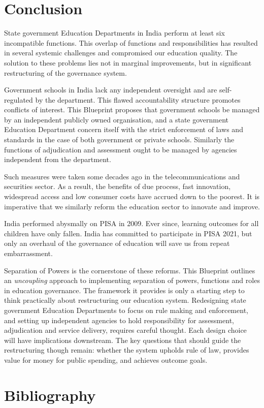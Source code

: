 \documentclass[a4paper, 12pt, twoside]{article}
\begin{document}
\newpage
\section*{Conclusion}

State government Education Departments in India perform at least six incompatible functions. This overlap of functions and responsibilities has resulted in several systemic challenges and compromised our education quality. The solution to these problems lies not in marginal improvements, but in significant restructuring of the governance system. 

Government schools in India lack any independent oversight and are self-regulated by the department. This flawed accountability structure promotes conflicts of interest. This Blueprint proposes that government schools be managed by an independent publicly owned organisation, and a state government Education Department concern itself with the strict enforcement of laws and standards in the case of both government or private schools. Similarly the functions of adjudication and assessment ought to be managed by agencies independent from the department.

Such measures were taken some decades ago in the telecommunications and securities sector. As a result, the benefits of due process, fast innovation, widespread access and low consumer costs have accrued down to the poorest. It is imperative that we similarly reform the education sector to innovate and improve. 

India performed abysmally on PISA in 2009. Ever since, learning outcomes for all children have only fallen. India has committed to participate in PISA 2021, but only an overhaul of the governance of education will save us from repeat embarrassment. 

Separation of Powers is the cornerstone of these reforms. This Blueprint outlines an \textit{uncoupling} approach to implementing separation of powers, functions and roles in education governance. The framework it provides is only a starting step to think practically about restructuring our education system. Redesigning state government Education Departments to focus on rule making and enforcement, and setting up independent agencies to hold responsibility for assessment, adjudication and service delivery, requires careful thought. Each design choice will have implications downstream. The key questions that should guide the restructuring though remain: whether the system upholds rule of law, provides value for money for public spending, and achieves outcome goals. 
\newpage
\section*{Bibliography}
\printbibliography[heading=none] 

\newpage
{} %
\pagestyle{empty} %


                                        
\end{document}
